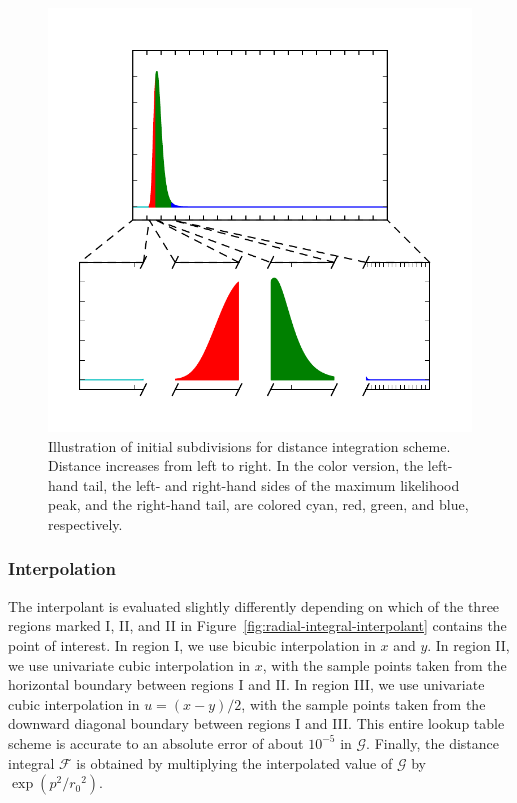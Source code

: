 \documentclass[amsmath,amssymb,aps,prx,reprint,nopreprintnumbers,nofootinbib]{revtex4-1}
\begin{document}
\begin{figure}
    \begin{center}
        \includegraphics[width=\columnwidth]{radial_integrand}
    \end{center}
    \caption{\label{fig:radial_integrand}Illustration of initial subdivisions for distance integration scheme. Distance increases from left to right. In the color version, the left\nobreakdashes-hand tail, the left\nobreakdashes- and right\nobreakdashes-hand sides of the maximum likelihood peak, and the right\nobreakdashes-hand tail, are colored cyan, red, green, and blue, respectively.}
\end{figure}

\subsubsection{Interpolation}

The interpolant is evaluated slightly differently depending on which of the three regions marked I, II, and II in Figure~\ref{fig:radial-integral-interpolant} contains the point of interest. In region I, we use bicubic interpolation in $x$ and $y$. In region II, we use univariate cubic interpolation in $x$, with the sample points taken from the horizontal boundary between regions I and II. In region III, we use univariate cubic interpolation in $u = (x - y) / 2$, with the sample points taken from the downward diagonal boundary between regions I and III. This entire lookup table scheme is accurate to an absolute error of about $10^{-5}$ in $\mathscr{G}$. Finally, the distance integral $\mathscr{F}$ is obtained by multiplying the interpolated value of $\mathscr{G}$ by $\exp\left(p^2/{r_0}^2\right)$.
\end{document}
